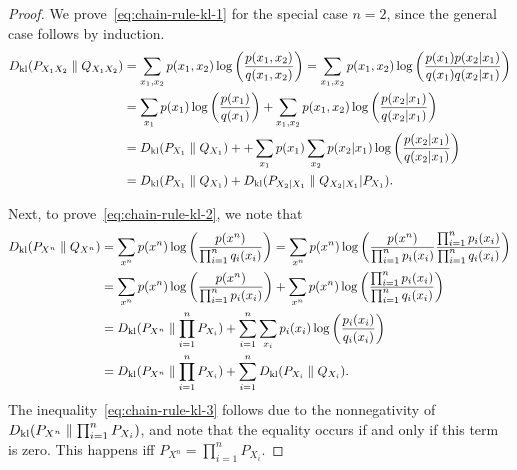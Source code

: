             \begin{proof}
                We prove~\eqref{eq:chain-rule-kl-1} for the special case $n=2$, since the general case follows by induction. 
                \begin{align}
                    D_{\text{kl}}(P_{X_1 X_2} \parallel  Q_{X_1 X_2} ) &= \sum_{x_1, x_2} p(x_1, x_2) \log \left( \frac{p(x_1, x_2)}{q(x_1, x_2)} \right) = \sum_{x_1, x_2} p(x_1, x_2) \log \left( \frac{p(x_1)p(x_2|x_1)}{q(x_1) q(x_2|x_1)} \right) \\
                    & = \sum_{x_1} p(x_1) \log \left( \frac{p(x_1)}{q(x_1)} \right)
                    + \sum_{x_1, x_2} p(x_1, x_2) \log \left( \frac{p(x_2|x_1)}{ q(x_2|x_1)} \right) \\
                    & = D_{\text{kl}}(P_{X_1} \parallel Q_{X_1}) + 
                    + \sum_{x_1} p(x_1) \sum_{x_2} p(x_2|x_1) \log \left( \frac{p(x_2|x_1)}{ q(x_2|x_1)} \right) \\ 
                    & = D_{\text{kl}}(P_{X_1} \parallel Q_{X_1} ) + D_{\text{kl}}(P_{X_2|X_1} \parallel Q_{X_2|X_1} | P_{X_1}). 
                \end{align}

                Next, to prove~\eqref{eq:chain-rule-kl-2}, we note that 
                \begin{align}
                    D_{\text{kl}}(P_{X^n} \parallel Q_{X^n} ) &= \sum_{x^n} p(x^n) \log \left( \frac{ p(x^n)}{\prod_{i=1}^n q_i(x_i)} \right) 
                    = \sum_{x^n} p(x^n) \log \left( \frac{ p(x^n)}{\prod_{i=1}^n p_i(x_i)} \frac{\prod_{i=1}^n p_i(x_i)}{\prod_{i=1}^n q_i(x_i)} \right) \\
                    & = \sum_{x^n} p(x^n) \log \left(\frac{ p(x^n)}{\prod_{i=1}^n p_i(x_i)} \right) + \sum_{x^n } p(x^n)   \log \left( \frac{\prod_{i=1}^n p_i(x_i)}{\prod_{i=1}^n q_i(x_i)} \right) \\
                    & = D_{\text{kl}}(P_{X^n} \parallel \prod_{i=1}^n P_{X_i}) +  \sum_{i=1}^n \sum_{x_i } p_i(x_i)   \log \left( \frac{p_i(x_i)}{q_i(x_i)} \right)  \\
                    & = D_{\text{kl}}(P_{X^n} \parallel \prod_{i=1}^n P_{X_i}) +  \sum_{i=1}^n  D_{\text{kl}}(P_{X_i} \parallel Q_{X_i}). 
                \end{align}
                The inequality~\eqref{eq:chain-rule-kl-3} follows due to the nonnegativity of~$D_{\text{kl}}(P_{X^n} \parallel \prod_{i=1}^n P_{X_i})$, and note that the equality occurs if and only if this term is zero. This happens iff $P_{X^n} = \prod_{i=1}^n P_{X_i}$. 
            \end{proof}

